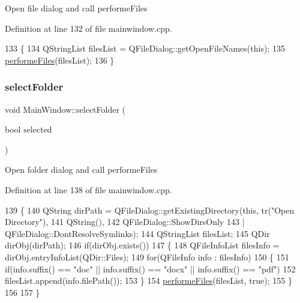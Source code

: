 Open file dialog and call performe\+Files 

Definition at line 132 of file mainwindow.\+cpp.


\begin{DoxyCode}
133 \{
134     QStringList filesList = QFileDialog::getOpenFileNames(\textcolor{keyword}{this});
135     \hyperlink{class_main_window_a48108540b64f60b2785c397cee553fbf}{performeFiles}(filesList);
136 \}
\end{DoxyCode}
\mbox{\label{class_main_window_ac7e1b1634d7b3e15641ca73422a4648d}} 
\subsubsection{\texorpdfstring{select\+Folder}{selectFolder}}
{\footnotesize\ttfamily void Main\+Window\+::select\+Folder (\begin{DoxyParamCaption}\item[{bool}]{selected }\end{DoxyParamCaption})\hspace{0.3cm}{\ttfamily [slot]}}

Open folder dialog and call performe\+Files 

Definition at line 138 of file mainwindow.\+cpp.


\begin{DoxyCode}
139 \{
140     QString dirPath = QFileDialog::getExistingDirectory(\textcolor{keyword}{this}, tr(\textcolor{stringliteral}{"Open Directory"}),
141                                                         QString(),
142                                                         QFileDialog::ShowDirsOnly
143                                                         | QFileDialog::DontResolveSymlinks);
144     QStringList filesList;
145     QDir dirObj(dirPath);
146     \textcolor{keywordflow}{if}(dirObj.exists())
147     \{
148         QFileInfoList filesInfo = dirObj.entryInfoList(QDir::Files);
149         \textcolor{keywordflow}{for}(QFileInfo info : filesInfo)
150         \{
151             \textcolor{keywordflow}{if}(info.suffix() == \textcolor{stringliteral}{"doc"} || info.suffix() == \textcolor{stringliteral}{"docx"} || info.suffix() == \textcolor{stringliteral}{"pdf"})
152                 filesList.append(info.filePath());
153         \}
154         \hyperlink{class_main_window_a48108540b64f60b2785c397cee553fbf}{performeFiles}(filesList, \textcolor{keyword}{true});
155     \}
156 
157 \}
\end{DoxyCode}
\mbox{\label{class_main_window_ab7a1a0cb0ab474a3fc80d17bf37c6b47}} 
